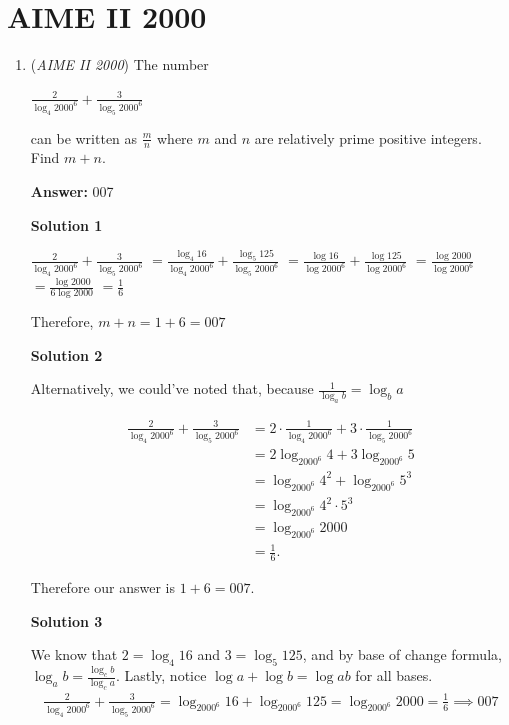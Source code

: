 \section{AIME II 2000}
        \begin{enumerate}
        	\item (\textit{AIME II 2000}) The number


 $\frac 2{\log_4{2000^6}} + \frac 3{\log_5{2000^6}}$

 can be written as $\frac mn$ where $m$ and $n$ are relatively prime positive integers.  Find $m + n$.


 
 \textbf{Answer: }007



\textbf{Solution 1}

$\frac 2{\log_4{2000^6}} + \frac 3{\log_5{2000^6}}$
$=\frac{\log_4{16}}{\log_4{2000^6}}+\frac{\log_5{125}}{\log_5{2000^6}}$
$=\frac{\log{16}}{\log{2000^6}}+\frac{\log{125}}{\log{2000^6}}$
$=\frac{\log{2000}}{\log{2000^6}}$
$=\frac{\log{2000}}{6\log{2000}}$
$=\frac{1}{6}$

 Therefore, $m+n=1+6=\boxed{007}$




\textbf{Solution 2}

Alternatively, we could've noted that, because $\frac 1{\log_a{b}} = \log_b{a}$

 \begin{align*} \frac 2{\log_4{2000^6}} + \frac 3{\log_5{2000^6}} &= 2 \cdot \frac{1}{\log_4{2000^6}} + 3\cdot \frac {1}{\log_5{2000^6} }\\ &=2{\log_{2000^6}{4}} + 3{\log_{2000^6}{5}} \\ &={\log_{2000^6}{4^2}} + {\log_{2000^6}{5^3}}\\ &={\log_{2000^6}{4^2 \cdot 5^3}}\\ &={\log_{2000^6}{2000}}\\ &= {\frac{1}{6}}.\end{align*}


 Therefore our answer is $1 + 6 = \boxed{007}$.

 



\textbf{Solution 3}

We know that $2 = \log_4{16}$ and $3 = \log_5{125}$, and by base of change formula, $\log_a{b} = \frac{\log_c{b}}{\log_c{a}}$. Lastly, notice $\log a + \log b = \log ab$ for all bases.
 \begin{align*} \frac 2{\log_4{2000^6}} + \frac 3{\log_5{2000^6}} = \log_{2000^6}{16} + \log_{2000^6}{125} = \log_{2000^6}{2000} = \frac16 \implies \boxed{007} \end{align*}


\end{enumerate}
